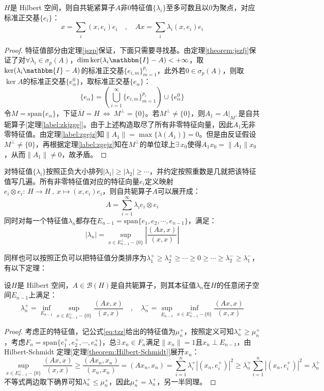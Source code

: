 \begin{theorem}\label{theorem:Hilbert-Schmidt}
$H$是 Hilbert 空间，则自共轭紧算子$A$非0特征值$\{\lambda_i\}$至多可数且以0为聚点，对应标准正交基$\{e_i\}$：
\[x=\sum_{i}(x,e_i)e_i \quad , \quad Ax=\sum_{i}\lambda_i(x,e_i)e_i\]
\end{theorem}
\begin{proof}
特征值部分由定理\ref{jszp}保证，下面只需要寻找基。由定理\ref{theorem:jszfj}保证了对$\forall \lambda_i \in \sigma_p(A)$，$\dim\ker(\lambda_i\mathbbm{I}-A)<+\infty$，取$\ker(\lambda_i\mathbbm{I}-A)$的标准正交基$\{e_{i,m}\}_{m=1}^{p_i}$，此外若$0 \in \sigma_p(A)$，则取$\ker A$的标准正交基$\{e_{\alpha}^0\}$，取标准正交基$\{e_{\alpha}\}$：
\[\{e_{\alpha}\}=\left(\bigcup_{i=1}^{\infty}\{e_{i,m}\}_{m=1}^{p_i}\right)\cup\{e_{\alpha}^0\}\]
令$M=\text{span}\{e_{\alpha}\}$，下证$\overline{M}=H \ \Leftrightarrow \ M^{\perp}=\{0\}$。若$M^{\perp} \neq \{0\}$，则$A_1=A|_{M^{\perp}}$是自共轭算子[定理\ref{label:zkjzge}]。由于上述构造取尽了所有非零特征向量，因此$A_1$无非零特征值。由定理\ref{label:zgejz}知$\|A_1\|=\max\{\lambda(A_1)\}=0$。但是由反证假设$M^{\perp} \neq \{0\}$，再根据定理\ref{label:zgejz}知在$M^{\perp}$的单位球上$\exists \, x_0$使得$A_1x_0=\|A_1\|x_0$，从而$\|A_1\|\neq0$，故矛盾。
\end{proof}
\begin{remark}
\quad 对特征值$\{\lambda_i\}$按照正负大小排列$|\lambda_1|\geq|\lambda_2|\geq\cdots$，并约定按照重数是几就把该特征值写几遍。所有非零特征值对应的特征向量$e_i$定义映射$e_i \otimes e_i: \ H \to H \ , \ x \mapsto (x,e_i)e_i$，则自共轭算子$A$可以展开成：
\[A=\sum_{i=1}^{\infty}\lambda_ie_i \otimes e_i\]
同时对每一个特征值$\lambda_n$都存在$E_{n-1}=\text{span}\{e_1,e_2,\cdots,e_{n-1}\}$，满足：
\begin{equation}\label{eq:tzz}
|\lambda_n|=\sup_{x \in E_{n-1}^{\perp}-\{0\}}\left|\frac{(Ax,x)}{(x,x)}\right|
\end{equation}
\end{remark}
同样也可以按照正负可以把特征值分类排序为$\lambda_1^+\geq\lambda_2^+\geq\cdots\geq0\geq\cdots\geq\lambda_2^-\geq\lambda_1^-$，有以下定理：
\begin{theorem}\label{theorem:tzzgj}
设$H$是 Hilbert 空间，$A\in\mathscr{B}(H)$是自共轭算子，则其本征值$\lambda_n$在$H$的任意闭子空间$E_{n-1}$上满足：
\[\lambda_n^+=\inf_{E_{n-1}}\sup_{x \in E_{n-1}^{\perp}-\{0\}}\frac{(Ax,x)}{(x,x)} \quad , \quad \lambda_n^-=\sup_{E_{n-1}}\inf_{x \in E_{n-1}^{\perp}-\{0\}}\frac{(Ax,x)}{(x,x)}\]
\end{theorem}
\begin{proof}
考虑正的特征值，记公式\ref{eq:tzz}给出的特征值为$\mu_n^+$，按照定义可知$\lambda_n^+\geq\mu_n^+$，考虑$F_n=\text{span}\{e_1^+,e_2^+,\cdots,e_n^+\}$，总$\exists \, x_n \in F_n$满足$\|x_n\|=1$且$x_n \perp E_{n-1}$，由 Hilbert-Schmidt 定理[定理\ref{theorem:Hilbert-Schmidt}]展开$x_n$：
\[\sup_{x \in E_{n-1}^{\perp}-\{0\}}\frac{(Ax,x)}{(x,x)}\geq\frac{(Ax_n,x_n)}{(x_n,x_n)}=(Ax_n,x_n)=\sum_{i=1}^n\lambda_i^+|(x_n,e_i^+)|^2\geq\lambda_n^+\sum_{i=1}^n|(x_n,e_i^+)|^2=\lambda_n^+\]
不等式两边取下确界可知$\lambda_n^+\leq\mu_n^+$，因此$\mu_n^+=\lambda_n^+$，另一半同理。
\end{proof}

